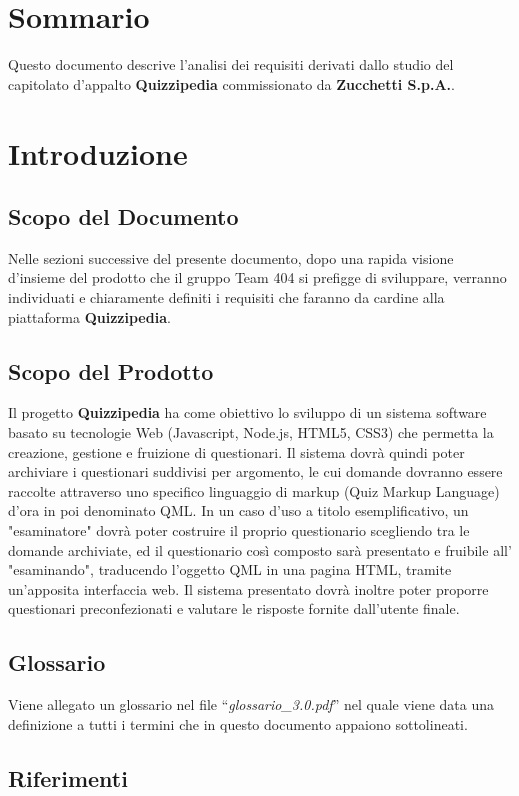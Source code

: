 \documentclass[a4paper,11pt]{article}
\begin{document}
	\renewcommand{\arraystretch}{2}
	\section*{Sommario}
	Questo documento descrive l’analisi dei requisiti derivati dallo studio del capitolato d’appalto \textbf{Quizzipedia} commissionato da \textbf{Zucchetti S.p.A.}.
	
	\newpage
	\section{Introduzione}
	\subsection{Scopo del Documento}
	Nelle sezioni successive del presente documento, dopo una rapida visione d'insieme del prodotto che il gruppo Team 404 si prefigge di sviluppare, verranno individuati e chiaramente definiti i requisiti che faranno da cardine alla piattaforma \textbf{Quizzipedia}.
	\subsection{Scopo del Prodotto}
	Il progetto \textbf{Quizzipedia} ha come obiettivo lo sviluppo di un sistema software basato su tecnologie Web (Javascript, Node.js, HTML5, CSS3) che permetta la creazione, gestione e fruizione di questionari. Il sistema dovrà quindi poter archiviare i questionari suddivisi per argomento, le cui domande dovranno essere raccolte attraverso uno specifico linguaggio di markup (Quiz Markup Language) d'ora in poi denominato QML. In un caso d'uso a titolo esemplificativo, un "esaminatore" dovrà poter costruire il proprio questionario scegliendo tra le domande archiviate, ed il questionario così composto sarà presentato e fruibile all' "esaminando", traducendo l'oggetto QML in una pagina HTML, tramite un'apposita interfaccia web. Il sistema presentato dovrà inoltre poter proporre questionari preconfezionati e valutare le risposte fornite dall'utente finale.
	\subsection{Glossario}
	Viene allegato un glossario nel file ``\textit{glossario\_3.0.pdf}'' nel quale viene data una definizione a tutti i termini che in questo documento appaiono sottolineati.
	\subsection{Riferimenti}
\end{document}
